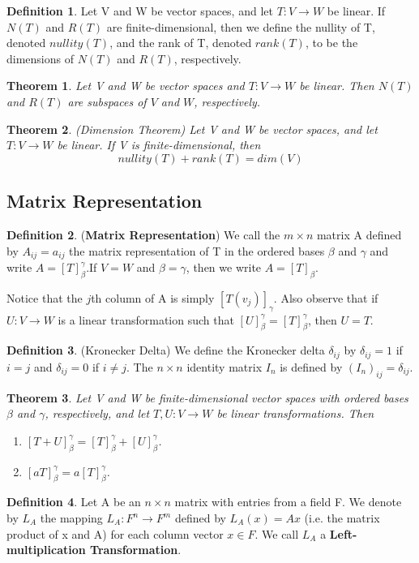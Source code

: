\documentclass[12pt]{article}
\newtheorem{theorem}{Theorem}[section]
\theoremstyle{definition}
\newtheorem{definition}{Definition}[section]
\theoremstyle{remark}
\begin{document}
    \begin{definition}
        Let V and W be vector spaces, and let $T: V \rightarrow W$ be linear. If $N(T)$ and $R(T)$ are finite-dimensional, 
        then we define the nullity of T, denoted $nullity(T)$, and the rank of T, denoted $rank(T)$, to be the dimensions 
        of $N(T)$ and $R(T)$, respectively.
    \end{definition}
    \begin{theorem}
        Let V and W be vector spaces and $T: V \rightarrow W$ be linear. Then $N(T)$ and $R(T)$ are subspaces of $V$ and $W$, respectively.
    \end{theorem}
    \begin{theorem}(Dimension Theorem)
        Let V and W be vector spaces, and let $T: V \rightarrow W$ be linear. If V is finite-dimensional, then
        $$nullity(T) + rank(T) = dim(V)$$

    \end{theorem}
\subsection{Matrix Representation}

    \begin{definition}(\textbf{Matrix Representation})
        We call the $m \times n$ matrix A defined by $A_{ij} = a_{ij}$ the matrix representation of T in the ordered 
        bases $\beta$ and $\gamma$ and write $A=[T]^\gamma_\beta$.If $V=W$ and $\beta=\gamma$, then we write 
        $A=[T]_\beta$.
        
        Notice that the $j$th column of A is simply $[T(v_j)]_\gamma$. Also observe that if
        $U: V \rightarrow W$ is a linear transformation such that $[U]^\gamma_\beta = [T]^\gamma_\beta$, then $U = T$.
    \end{definition}
    \begin{definition}(Kronecker Delta)
        We define the Kronecker delta $\delta_{ij}$ by $\delta_{ij} = 1$ if $i=j$ and
        $\delta_{ij} =0$ if $i\neq j$. The $n \times n$ identity matrix $I_n$ is defined by $(I_n)_{ij} = \delta_{ij}$.
    \end{definition}
    \begin{theorem}
        Let V and W be finite-dimensional vector spaces with ordered bases $\beta$ and $\gamma$, respectively, and let $T, U: V \rightarrow W$ be linear transformations. Then
        \begin{enumerate}
            \item $[T+U]^\gamma_\beta=[T]^\gamma_\beta +[U]^\gamma_\beta$.
            \item $[aT]^\gamma_\beta = a[T]^\gamma_\beta$.
        \end{enumerate}

    \end{theorem}
    \begin{definition}
        Let A be an $n\times n$ matrix with entries from a field F. We denote by 
        $L_A$ the mapping $L_A: F^n\rightarrow F^m$ defined by $L_A(x) = Ax$ (i.e. the matrix 
        product of x and A) for each column vector $x\in F$. We call $L_A$ a \textbf{Left-multiplication Transformation}.
    \end{definition}
\end{document}
